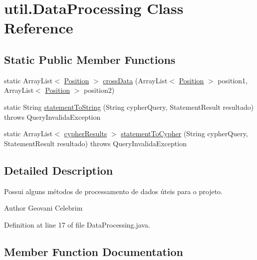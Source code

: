 \hypertarget{classutil_1_1DataProcessing}{}\section{util.\+Data\+Processing Class Reference}
\label{classutil_1_1DataProcessing}
\subsection*{Static Public Member Functions}
\begin{DoxyCompactItemize}
\item 
static Array\+List$<$ \hyperlink{classentidade_1_1Position}{Position} $>$ \hyperlink{classutil_1_1DataProcessing_a0551eb49141e5ccab05dfc9fe40c57d7}{cross\+Data} (Array\+List$<$ \hyperlink{classentidade_1_1Position}{Position} $>$ position1, Array\+List$<$ \hyperlink{classentidade_1_1Position}{Position} $>$ position2)
\item 
static String \hyperlink{classutil_1_1DataProcessing_ae56c5b29df8fc14baf4abac4bd225fd8}{statement\+To\+String} (String cypher\+Query, Statement\+Result resultado)  throws Query\+Invalida\+Exception 
\item 
static Array\+List$<$ \hyperlink{classentidade_1_1resultados_1_1cypherResults}{cypher\+Results} $>$ \hyperlink{classutil_1_1DataProcessing_a9929ea41acdba832995351f10610135a}{statement\+To\+Cypher} (String cypher\+Query, Statement\+Result resultado)  throws Query\+Invalida\+Exception 
\end{DoxyCompactItemize}


\subsection{Detailed Description}
Possui alguns métodos de processamento de dados úteis para o projeto.

\begin{DoxyAuthor}{Author}
Geovani Celebrim 
\end{DoxyAuthor}


Definition at line 17 of file Data\+Processing.\+java.



\subsection{Member Function Documentation}
\hypertarget{classutil_1_1DataProcessing_a0551eb49141e5ccab05dfc9fe40c57d7}{}\label{classutil_1_1DataProcessing_a0551eb49141e5ccab05dfc9fe40c57d7} 
